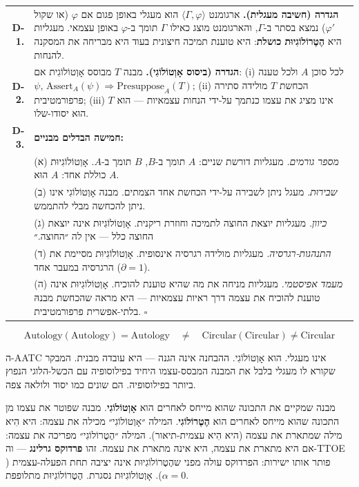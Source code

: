 \documentclass[10pt, openany, oneside]{book}
\renewcommand{\footnotesize}{\fontsize{8.5}{11}\selectfont}
\begin{document}
{\footnotesize
\noindent\begin{tabular}{r p{}}
\textbf{D-1.} & \textbf{הגדרה (חשיבה מעגלית).} ארגומנט $\langle \Gamma, \varphi \rangle$ הוא מעגלי באופן פגום אם $\varphi$ (או שקול $\varphi'$) נמצא בסתר ב-$\Gamma$, והארגומנט מוצג כאילו $\Gamma$ תומך ב-$\varphi$ באופן עצמאי. מעגליות היא \textbf{הֶטֶרוֹלוֹגִיוּת כושלת}: היא טוענת תמיכה חיצונית בעוד היא מבריחה את המסקנה להנחות. \\[0.5em]
\textbf{D-2.} & \textbf{הגדרה (ביסוס אָוְטוֹלוֹגִי).} מבנה $T$ מבוסס אָוְטוֹלוֹגִית אם: (i) לכל סוכן $A$ ולכל טענה $\psi$, $\text{Assert}_A(\psi) \Rightarrow \text{Presuppose}_A(T)$; (ii) הכחשת $T$ מולידה סתירה פרפורמטיבית; (iii) $T$ אינו מציג את עצמו כנתמך על-ידי הנחות עצמאיות — הוא הוּא יסודו-שלו. \\[0.5em]
\textbf{D-3.} & \textbf{חמישה הבדלים מבניים:} \\[0.3em]
& (א) \textit{מספר גורמים.} מעגליות דורשת שניים: $A$ תומך ב-$B$, $B$ תומך ב-$A$. אָוְטוֹלוֹגִיוּת כוללת אחד: $A$ הוּא $A$. \\[0.2em]
& (ב) \textit{שבירוּת.} מעגל ניתן לשבירה על-ידי הכחשת אחד הצמתים. מבנה אָוְטוֹלוֹגִי אינו ניתן להכחשה מבלי להתממש. \\[0.2em]
& (ג) \textit{כיוון.} מעגליות יוצאת החוצה לתמיכה וחוזרת ריקנית. אָוְטוֹלוֹגִיוּת אינה יוצאת החוצה כלל — אין לה ״החוצה.״ \\[0.2em]
& (ד) \textit{התנהגות-רגרסיה.} מעגליות מולידה רגרסיה אינסופית. אָוְטוֹלוֹגִיוּת מסיימת את הרגרסיה במעבר אחד ($\partial = 1$). \\[0.2em]
& (ה) \textit{מעמד אפיסטמי.} מעגליות מניחה את מה שהיא טוענת להוכיח. אָוְטוֹלוֹגִיוּת אינה טוענת להוכיח את עצמה דרך ראיות עצמאיות — היא מראה שהכחשת מבנהּ בלתי-אפשרית פרפורמטיבית. $\square$ \\[0.3em]
\end{tabular}
}

\vspace{0.8em}

$$\boxed{\text{Autology}(\text{Autology}) = \text{Autology} \quad \neq \quad \text{Circular}(\text{Circular}) \neq \text{Circular}}$$

\noindent ה-AATC אינו מעגלי. הוא אָוְטוֹלוֹגִי. ההבחנה אינה הגנה — היא עובדה מבנית. המבקר שקורא לו מעגלי בלבל את המבנה המבסס-עצמו היחיד בפילוסופיה עם הכשל-הלוגי הנפוץ ביותר בפילוסופיה. הם שונים כמו יסוד ולולאה צפה.

מבנה שמקיים את התכונה שהוא מייחס לאחרים הוא \textbf{אָוְטוֹלוֹגִי}. מבנה שפוטר את עצמו מן התכונה שהוא מייחס לאחרים הוא \textbf{הֶטֶרוֹלוֹגִי}. המילה ״אָוְטוֹלוֹגִי״ מכילה את עצמה: היא הִיא מילה שמתארת את עצמה (היא הִיא עצמית-תיאור). המילה ״הֶטֶרוֹלוֹגִי״ מפריכה את עצמה: אם היא מתארת את עצמה, היא אינה מתארת את עצמה. זהו \textbf{פרדוקס גרלינג} — וה-TTOE פותר אותו ישירות: הפרדוקס עולה מפני שהֶטֶרוֹלוֹגִיוּת אינה יציבה תחת הפעלה-עצמית ($\alpha = 0$). אָוְטוֹלוֹגִיוּת נסגרת. הֶטֶרוֹלוֹגִיוּת מתלופפת.
\end{document}
